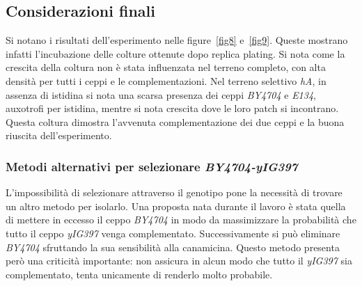 	\subsection*{Considerazioni finali}
	Si notano i risultati dell'esperimento nelle figure~\ref{fig8} e~\ref{fig9}.
	Queste mostrano infatti l'incubazione delle colture ottenute dopo replica plating.
	Si nota come la crescita della coltura non \`e stata influenzata nel terreno completo, con alta densit\`a per tutti i ceppi e le complementazioni.
	Nel terreno selettivo \emph{hA}, in assenza di istidina si nota una scarsa presenza dei ceppi \emph{BY4704} e \emph{E134}, auxotrofi per istidina, mentre si nota crescita dove le loro patch si incontrano.
	Questa coltura dimostra l'avvenuta complementazione dei due ceppi e la buona riuscita dell'esperimento.
	
		\subsubsection*{Metodi alternativi per selezionare \emph{BY4704-yIG397}}
		L'impossibilit\`a di selezionare attraverso il genotipo pone la necessit\`a di trovare un altro metodo per isolarlo.
		Una proposta nata durante il lavoro \`e stata quella di mettere in eccesso il ceppo \emph{BY4704} in modo da massimizzare la probabilit\`a che tutto il ceppo \emph{yIG397} venga complementato.
		Successivamente si pu\`o eliminare \emph{BY4704} sfruttando la sua sensibilit\`a alla canamicina.
		Questo metodo presenta per\`o una criticit\`a importante: non assicura in alcun modo che tutto il \emph{yIG397} sia complementato, tenta unicamente di renderlo molto probabile.
	
